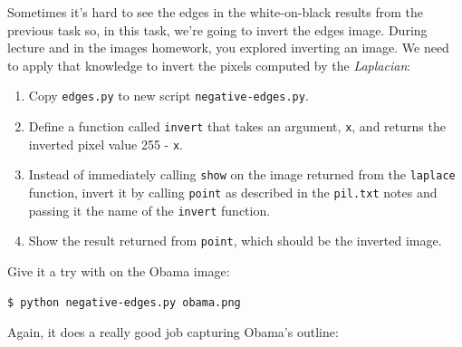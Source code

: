 Sometimes it's hard to see the edges in the white-on-black results from the previous task so, in this task, we're going to invert the edges image.  During lecture and in the images homework, you explored inverting an image. We need to apply that knowledge to invert the pixels computed by the {\em Laplacian}:

\begin{enumerate}
\item Copy {\tt edges.py} to new script {\tt negative-edges.py}.
\item Define a function called {\tt invert} that takes an argument, {\tt x}, and returns the inverted pixel value 255 - {\tt x}.
\item Instead of immediately calling {\tt show} on the image returned from the {\tt laplace} function, invert it by calling {\tt point} as described in the {\tt pil.txt} notes and passing it the name of the {\tt  invert} function.
\item Show the result returned from {\tt point}, which should be the inverted image.
\end{enumerate}

\noindent Give it a try with on the Obama image:

\begin{lstlisting}[style=BashInputStyle]
$ python negative-edges.py obama.png
\end{lstlisting}

\noindent Again, it does a really good job capturing Obama's outline:\\
~\\

